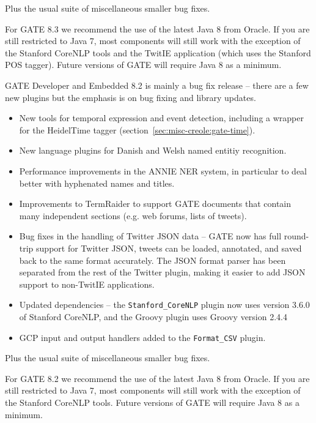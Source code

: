 Plus the usual suite of miscellaneous smaller bug fixes.


For GATE 8.3 we recommend the use of the latest Java 8 from Oracle.  If you are
still restricted to Java 7, most components will still work with the exception
of the Stanford CoreNLP tools and the TwitIE application (which uses the
Stanford POS tagger).  Future versions of GATE will require Java 8 as a
minimum.


GATE Developer and Embedded 8.2 is mainly a bug fix release -- there are a few
new plugins but the emphasis is on bug fixing and library updates.

\begin{itemize}
\item New tools for temporal expression and event detection, including a wrapper
  for the HeidelTime tagger (section~\ref{sec:misc-creole:gate-time}).
\item New language plugins for Danish and Welsh named entitiy recognition.
\item Performance improvements in the ANNIE NER system, in particular to deal
  better with hyphenated names and titles.
\item Improvements to TermRaider to support GATE documents that contain many
  independent sections (e.g. web forums, lists of tweets).
\item Bug fixes in the handling of Twitter JSON data -- GATE now has full
  round-trip support for Twitter JSON, tweets can be loaded, annotated, and
  saved back to the same format accurately.  The JSON format parser has been
  separated from the rest of the Twitter plugin, making it easier to add JSON
  support to non-TwitIE applications.
\item Updated dependencies -- the \verb!Stanford_CoreNLP! plugin now uses
  version 3.6.0 of Stanford CoreNLP, and the Groovy plugin uses Groovy version
  2.4.4
\item GCP input and output handlers added to the \verb!Format_CSV! plugin.
\end{itemize}

Plus the usual suite of miscellaneous smaller bug fixes.


For GATE 8.2 we recommend the use of the latest Java 8 from Oracle.  If you are
still restricted to Java 7, most components will still work with the exception
of the Stanford CoreNLP tools.  Future versions of GATE will require Java 8 as
a minimum.


